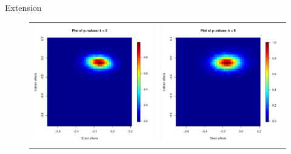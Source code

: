 \documentclass[final]{beamer}
\newlength{\onecolwid}
\newlength{\onecolwidd}
\begin{document}
\begin{frame}[t]
\begin{columns}[t]
\begin{column}{\onecolwidd}
\begin{block}{Extension}
\begin{rmfamily}
	\hspace{2cm}
	\begin{figure}
	\centering
	\begin{tabular}{cc}
	\includegraphics[scale=0.8]{pvalues_figure_3nn.pdf} &
	\includegraphics[scale=0.8]{pvalues_figure_5nn.pdf} \\ 

\end{tabular}
\end{figure}
\end{rmfamily}
\end{block}
\end{column}
\end{columns}
\end{frame}
\end{document}
